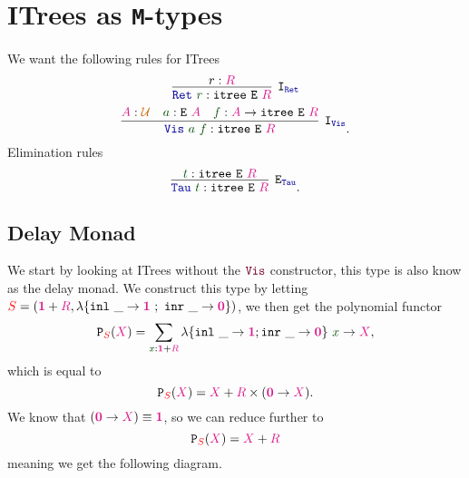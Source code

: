 \documentclass[twoside,11pt,openright]{report}
\theoremstyle{plain} %
\theoremstyle{definition}
\theoremstyle{remark}
\newcommand*{\term}[1]{\textcolor{green!30!black}{#1}} %
\newcommand*{\type}[1]{\textcolor{magenta!90!black}{#1}}
\newcommand*{\container}[1]{\textcolor{red}{#1}}
\newcommand*{\universe}[1]{\textcolor{orange!80!black}{#1}}
\newcommand*{\unit}{\type{\textbf{1}}}
\newcommand*{\empt}{\type{\textbf{0}}}
\newcommand*{\function}[1]{\textcolor{blue!60!black}{\ensuremath{\mathtt{#1}}}}
\newcommand*{\constructor}[1]{\textcolor{purple!60!black}{\ensuremath{\mathtt{#1}}}}
\newcommand*{\typeformer}[1]{\ensuremath{\mathtt{#1}}}
\newcommand*{\functor}[1]{\ensuremath{\mathbf{\mathtt{#1}}}}
\begin{document}
\section{ITrees as \texttt{M}-types}
We want the following rules for ITrees
\begin{equation}
  \infer[\mathtt{I}_{\function{Ret}}]{\function{Ret}~\term{r} : \typeformer{itree}~\typeformer{E}~\type{R}}{r : \type{R}}
\end{equation}
\begin{equation}
  \infer[\mathtt{I}_{\function{Vis}}]{\function{Vis}~\term{a}~\term{f} : \typeformer{itree}~\typeformer{E}~\type{R}}{\type{A} : \universe{\mathcal{U}} & \term{a} : \typeformer{E}~\type{A} & \term{f} : \type{A} \rightarrow \typeformer{itree}~\typeformer{E}~\type{R}}.
\end{equation}
Elimination rules
\begin{equation}
  \infer[\mathtt{E}_{\function{Tau}}]{\function{Tau}~\term{t} : \typeformer{itree}~\typeformer{E}~\type{R}}{\term{t} : \typeformer{itree}~\typeformer{E}~\type{R}}.
\end{equation}

\subsection{Delay Monad}
We start by looking at ITrees without the \(\constructor{Vis}\) constructor, this type is also know as the delay monad. We construct this type by letting \(\container{S} = (\unit + \type{R},\lambda \{ \texttt{inl}~\_ \rightarrow \unit~;~\texttt{inr}~\_ \rightarrow \empt \})\), we then get the polynomial functor
\begin{equation}
  \functor{P}_{\container{S}}(\type{X}) = \sum_{\term{x} : \unit + \type{R}} \lambda \{ \texttt{inl}~\_ \rightarrow \unit ; \texttt{inr}~\_ \rightarrow \empt\}~\term{x} \rightarrow \type{X},
\end{equation}
which is equal to
\begin{equation}
  \functor{P}_{\container{S}}(\type{X}) = \type{X} + \type{R} \times (\empt \rightarrow \type{X}).
\end{equation}
We know that \((\empt \rightarrow \type{X}) \equiv \unit\), so we can reduce further to
\begin{equation}
  \functor{P}_{\container{S}}(\type{X}) = \type{X} + \type{R}
\end{equation}
meaning we get the following diagram.
\end{document}
